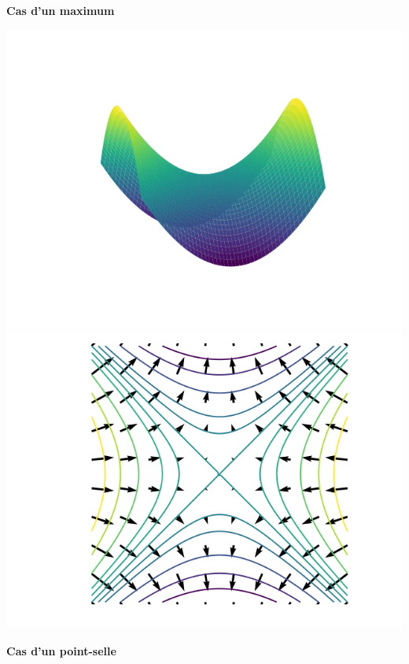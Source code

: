 \begin{center}
\begin{minipage}{0.30\textwidth}
		\quad\textbf{Cas d'un maximum}
	\end{minipage}
	\begin{minipage}{0.30\textwidth}
		\center
		\includegraphics[scale=\myscale,scale=0.35]{figures/gradient-surface-3c}\\
		
		\includegraphics[scale=\myscale,scale=0.35]{figures/gradient-surface-5c}
		
		\quad\textbf{Cas d'un point-selle}
	\end{minipage}
\end{center}

